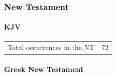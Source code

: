 		
	\subsubsection{New Testament} %
		\label{GOSPEL-NT}
	
		\paragraph{KJV}
			\label{GOSPEL-NT-KJV}
			
	
			\begin{tabular}{ll}
				Total occurrences in the NT & 72
			\end{tabular}
			
			\begin{compactdesc}
				\item[{\hyperref[ROMANS-1-16]{Romans 1:16}}]
			\end{compactdesc}
			
		\paragraph{Greek New Testament} %
			\label{GOSPEL-GREEK}
		
			\subparagraph{\texorpdfstring{}{}}
				\label{EUAGGELION}
			
